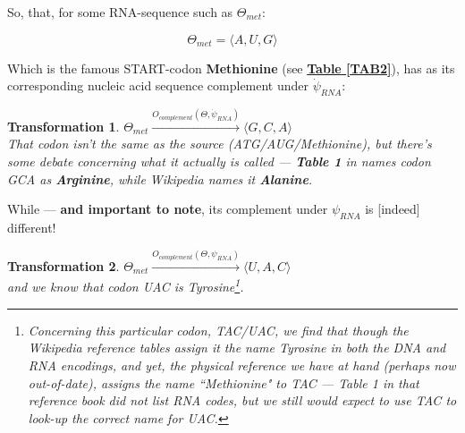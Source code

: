 \documentclass[a4paper, 18pt]{book} %
\newtheorem{trans}{Transformation}
\begin{document}
\vspace{1em}

So, that, for some RNA-sequence such as $\Theta_{met}$:

\vspace{1em}

\begin{equation}
\Theta_{met} = \langle A, U, G \rangle
\end{equation}

\vspace{1em}

Which is the famous START-codon \textbf{Methionine} (see \textbf{\hyperref[TAB2]{Table \ref{TAB2}}}), has as its corresponding nucleic acid sequence complement under $\dot{\psi}_{RNA}$:

\vspace{1em}

\begin{trans}
\label{TRANSGCA}
$\Theta_{met} \xrightarrow{O_{complement}(\Theta,\dot{\psi}_{RNA})}  \langle G, C, A \rangle$\\
That codon isn't the same as the source (ATG/AUG/Methionine), but there's some debate concerning what it actually is called --- \textbf{Table 1} in \cite{gregory1987oxford} names codon GCA as \textbf{Arginine}, while Wikipedia\cite{wikipedia_codon_tables} names it \textbf{Alanine}.
\end{trans}

\vspace{1em}

While --- \textbf{and important to note}, its complement under $\psi_{RNA}$ is [indeed] different!

\vspace{1em}

\begin{trans}
\label{TRANSUAC}
$\Theta_{met} \xrightarrow{O_{complement}(\Theta,\psi_{RNA})}  \langle U, A, C \rangle$
\\
and we know that codon UAC is Tyrosine\cite{wikipedia_codon_tables}\footnote{Concerning this particular codon, TAC/UAC, we find that though the Wikipedia reference tables assign it the name Tyrosine in both the DNA and RNA encodings, and yet, the physical reference we have at hand\cite{gregory1987oxford} (perhaps now out-of-date), assigns the name ``Methionine" to TAC --- Table 1 in that reference book did not list RNA codes, but we still would expect to use TAC to look-up the correct name for UAC.}.
\end{trans}
\end{document}
